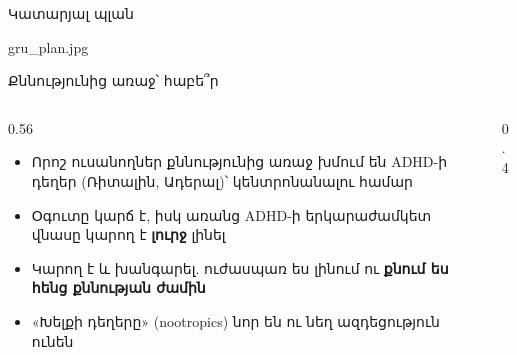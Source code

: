 \begin{frame}{Կատարյալ պլան}
  \centering
  \begin{meme}[9.4cm]{gru_plan.jpg}
  \end{meme}
\end{frame}

\begin{frame}{Քննությունից առաջ՝ հաբե՞ր}
  \begin{columns}[T]
    \begin{column}{0.56\textwidth}
      \begin{itemize}
        \item Որոշ ուսանողներ քննությունից առաջ խմում են ADHD-ի դեղեր (Ռիտալին, Ադերալ)՝ կենտրոնանալու համար
        \item<2-> Օգուտը կարճ է, իսկ առանց ADHD-ի երկարաժամկետ վնասը կարող է \textbf{լուրջ} լինել
        \item<3-> Կարող է և խանգարել. ուժասպառ ես լինում ու \textbf{քնում ես հենց քննության ժամին} 
        \item<4-> «Խելքի դեղերը» (nootropics) նոր են ու նեղ ազդեցություն ունեն
      \end{itemize}
    \end{column}
    \begin{column}{0.4\textwidth}
      \centering
      \par\smallskip
    \end{column}
  \end{columns}
\end{frame}

